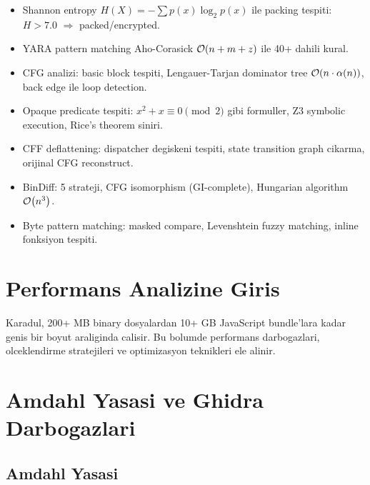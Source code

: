 \begin{ozet}
\begin{itemize}
  \item Shannon entropy $H(X) = -\sum p(x) \log_2 p(x)$ ile packing tespiti:
        $H > 7.0$ $\Rightarrow$ packed/encrypted.
  \item YARA pattern matching Aho-Corasick $\mathcal{O}\!\left(n+m+z\right)$ ile 40+ dahili kural.
  \item CFG analizi: basic block tespiti, Lengauer-Tarjan dominator tree $\mathcal{O}\!\left(n \cdot \alpha(n)\right)$,
        back edge ile loop detection.
  \item Opaque predicate tespiti: $x^2+x \equiv 0 \pmod{2}$ gibi formuller,
        Z3 symbolic execution, Rice's theorem siniri.
  \item CFF deflattening: dispatcher degiskeni tespiti, state transition
        graph cikarma, orijinal CFG reconstruct.
  \item BinDiff: 5 strateji, CFG isomorphism (GI-complete), Hungarian algorithm
        $\mathcal{O}\!\left(n^3\right)$.
  \item Byte pattern matching: masked compare, Levenshtein fuzzy matching,
        inline fonksiyon tespiti.
\end{itemize}
\end{ozet}


\newpage

%
%

\section{Performans Analizine Giris}
\label{sec:perf-giris}

Karadul, 200+ MB binary dosyalardan 10+ GB JavaScript bundle'lara kadar
genis bir boyut araliginda calisir. Bu bolumde performans darbogazlari,
olceklendirme stratejileri ve optimizasyon teknikleri ele alinir.


\section{Amdahl Yasasi ve Ghidra Darbogazlari}
\label{sec:amdahl}

\subsection{Amdahl Yasasi}

